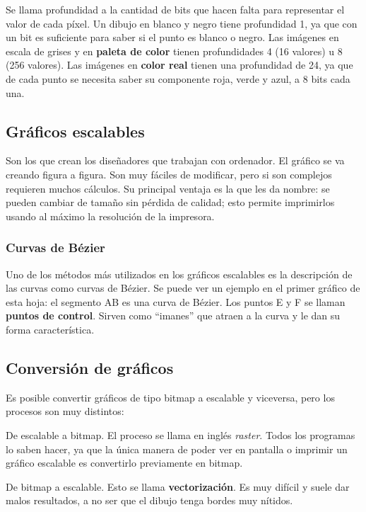 Se llama profundidad a la cantidad de bits que hacen falta para
representar el valor de cada píxel. Un dibujo en blanco y negro tiene
profundidad 1, ya que con un bit es suficiente para saber si el punto
es blanco o negro. Las imágenes en escala de grises y en
\textbf{paleta de color} tienen profundidades 4 (16 valores) u 8 (256
valores). Las imágenes en \textbf{color real} tienen una profundidad
de 24, ya que de cada punto se necesita saber su componente roja,
verde y azul, a 8 bits cada una.

\subsection{Gráficos escalables}

Son los que crean los diseñadores que trabajan con ordenador. El
gráfico se va creando figura a figura. Son muy fáciles de modificar,
pero si son complejos requieren muchos cálculos. Su principal ventaja
es la que les da nombre: se pueden cambiar de tamaño sin pérdida de
calidad; esto permite imprimirlos usando al máximo la resolución de la
impresora.

\subsubsection{Curvas de Bézier}

Uno de los métodos más utilizados en los gráficos escalables es la
descripción de las curvas como curvas de Bézier. Se puede ver un
ejemplo en el primer gráfico de esta hoja: el segmento AB es una curva
de Bézier. Los puntos E y F se llaman \textbf{puntos de
control}. Sirven como ``imanes'' que atraen a la curva y le dan su forma
característica.

\subsection{Conversión de gráficos}

Es posible convertir gráficos de tipo bitmap a escalable y viceversa,
pero los procesos son muy distintos:

De escalable a bitmap. El proceso se llama en inglés
\emph{raster}. Todos los programas lo saben hacer, ya que la única
manera de poder ver en pantalla o imprimir un gráfico escalable es
convertirlo previamente en bitmap.

De bitmap a escalable. Esto se llama \textbf{vectorización}. Es muy
difícil y suele dar malos resultados, a no ser que el dibujo tenga
bordes muy nítidos.

